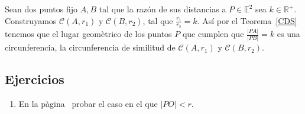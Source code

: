 \begin{dem}
Sean dos puntos fijo $A,B$ tal que  la razón de sus distancias a $P\in\mathbb{E}^{2}$ sea $k\in\mathbb{R}^{+}$. Construyamos $\mathcal{C}(A,r_{1})$ y $\mathcal{C}(B,r_{2})$, tal que $\frac{r_{1}}{r_{2}}=k$. Así por el  Teorema~\ref{CDS} tenemos que el lugar geomètrico de los puntos $P$  que cumplen que $\frac{|PA|}{|PB|}=k$ es una circunferencia, la circunferencia de similitud de $\mathcal{C}(A,r_{1})$ y $\mathcal{C}(B,r_{2})$. 
\end{dem}

\subsection*{Ejercicios}
\begin{enumerate}

\item En la pàgina~\pageref{POC2} probar el  caso en el que $|PO|<r$.\label{PO<r}
\end{enumerate}


